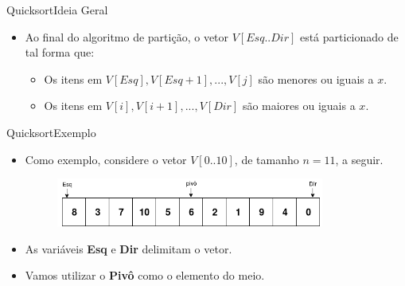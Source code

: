 \documentclass[aspectratio=169]{beamer}
\begin{document}

\begin{frame}{Quicksort}{Ideia Geral}
\begin{itemize}
\item Ao final do algoritmo de partição, o vetor $V[Esq..Dir]$ está particionado de tal forma que:
\begin{itemize}
\item Os itens em $V[Esq], V[Esq + 1], ... , V[j]$ são menores ou iguais a $x$.
\item Os itens em $V[i], V[i + 1], ..., V[Dir]$ são maiores ou iguais a $x$.
\end{itemize}
\end{itemize}
\end{frame}



\begin{frame}{Quicksort}{Exemplo}
\begin{itemize}
\item Como exemplo, considere o vetor $V[0..10]$, de tamanho $n=11$, a seguir.

\begin{figure}[!h]
  \centering
  \includegraphics[width=250pt]{imgs/quick/quick1.png}
  \label{fig_quick1}
\end{figure}

 \item As variáveis {\bf Esq} e {\bf Dir} delimitam o vetor.
 \item Vamos utilizar o {\bf Pivô} como o elemento do meio.
\end{itemize}
\end{frame}

\end{document}
